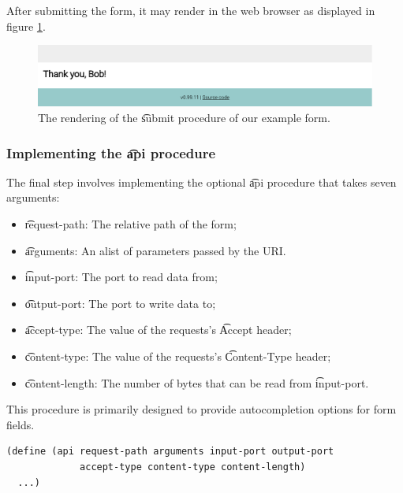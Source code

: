   After submitting the form, it may render in the web browser as displayed
  in figure \ref{fig:web-form-submit}.

  \begin{figure}[H]
    \begin{center}
      \includegraphics[width=1.0\textwidth]{figures/sg-web-form-example-submit.pdf}
    \end{center}
    \caption{The rendering of the \t{submit} procedure of our example form.}
    \label{fig:web-form-submit}
  \end{figure}


\subsubsection{Implementing the \t{api} procedure}

  The final step involves implementing the optional \t{api} procedure
  that takes seven arguments:
  \begin{itemize}
  \item \t{request-path}:   The relative path of the form;
  \item \t{arguments}:      An alist of parameters passed by the URI.
  \item \t{input-port}:     The port to read data from;
  \item \t{output-port}:    The port to write data to;
  \item \t{accept-type}:    The value of the requests's \t{Accept} header;
  \item \t{content-type}:   The value of the requests's \t{Content-Type} header;
  \item \t{content-length}: The number of bytes that can be read from
    \t{input-port}.
  \end{itemize}

  This procedure is primarily designed to provide autocompletion options
  for form fields.

\begin{lstlisting}[language=Lisp]
(define (api request-path arguments input-port output-port
             accept-type content-type content-length)
  ...)
\end{lstlisting}

